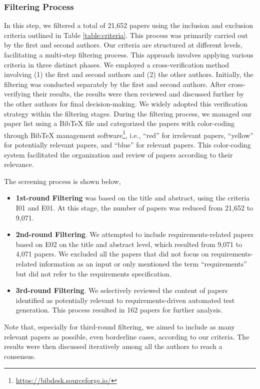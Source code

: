 

\subsubsection{Filtering Process}

In this step, we filtered a total of 21,652 papers using the inclusion and exclusion criteria outlined in Table \ref{table:criteria}. This process was primarily carried out by the first and second authors. Our criteria are structured at different levels, facilitating a multi-step filtering process. This approach involves applying various criteria in three distinct phases. We employed a cross-verification method involving (1) the first and second authors and (2) the other authors. Initially, the filtering was conducted separately by the first and second authors. After cross-verifying their results, the results were then reviewed and discussed further by the other authors for final decision-making. We widely adopted this verification strategy within the filtering stages. During the filtering process, we managed our paper list using a BibTeX file and categorized the papers with color-coding through BibTeX management software\footnote{\url{https://bibdesk.sourceforge.io/}}, i.e., “red” for irrelevant papers, “yellow” for potentially relevant papers, and “blue” for relevant papers. This color-coding system facilitated the organization and review of papers according to their relevance.

The screening process is shown below,
\begin{itemize}
    \item \textbf{1st-round Filtering} was based on the title and abstract, using the criteria I01 and E01. At this stage, the number of papers was reduced from 21,652 to 9,071.
    \item \textbf{2nd-round Filtering}. We attempted to include requirements-related papers based on E02 on the title and abstract level, which resulted from 9,071 to 4,071 papers. We excluded all the papers that did not focus on requirements-related information as an input or only mentioned the term ``requirements'' but did not refer to the requirements specification.
    \item \textbf{3rd-round Filtering}. We selectively reviewed the content of papers identified as potentially relevant to requirements-driven automated test generation. This process resulted in 162 papers for further analysis.
\end{itemize}
Note that, especially for third-round filtering, we aimed to include as many relevant papers as possible, even borderline cases, according to our criteria. The results were then discussed iteratively among all the authors to reach a consensus.

